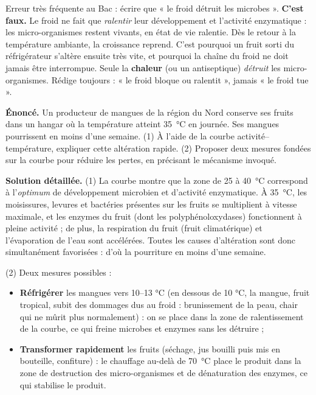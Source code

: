 \documentclass[11pt]{article}
\begin{document}
\begin{attention}
Erreur très fréquente au Bac : écrire que « le froid détruit les microbes ». \textbf{C'est faux.} Le froid ne fait que \emph{ralentir} leur développement et l'activité enzymatique : les micro-organismes restent vivants, en état de vie ralentie. Dès le retour à la température ambiante, la croissance reprend. C'est pourquoi un fruit sorti du réfrigérateur s'altère ensuite très vite, et pourquoi la chaîne du froid ne doit jamais être interrompue. Seule la \textbf{chaleur} (ou un antiseptique) \emph{détruit} les micro-organismes. Rédige toujours : « le froid bloque ou ralentit », jamais « le froid tue ».
\end{attention}

\begin{exoresolu}
\textbf{Énoncé.} Un producteur de mangues de la région du Nord conserve ses fruits dans un hangar où la température atteint \SI{35}{\celsius} en journée. Ses mangues pourrissent en moins d'une semaine. (1) À l'aide de la courbe activité--température, expliquer cette altération rapide. (2) Proposer deux mesures fondées sur la courbe pour réduire les pertes, en précisant le mécanisme invoqué.

\tcblower
\textbf{Solution détaillée.}
(1) La courbe montre que la zone de 25 à \SI{40}{\celsius} correspond à l'\emph{optimum} de développement microbien et d'activité enzymatique. À \SI{35}{\celsius}, les moisissures, levures et bactéries présentes sur les fruits se multiplient à vitesse maximale, et les enzymes du fruit (dont les polyphénoloxydases) fonctionnent à pleine activité ; de plus, la respiration du fruit (fruit climatérique) et l'évaporation de l'eau sont accélérées. Toutes les causes d'altération sont donc simultanément favorisées : d'où la pourriture en moins d'une semaine.

(2) Deux mesures possibles :
\begin{itemize}
\item \textbf{Réfrigérer} les mangues vers 10--13 \si{\celsius} (en dessous de 10 \si{\celsius}, la mangue, fruit tropical, subit des dommages dus au froid : brunissement de la peau, chair qui ne mûrit plus normalement) : on se place dans la zone de ralentissement de la courbe, ce qui freine microbes et enzymes sans les détruire ;
\item \textbf{Transformer rapidement} les fruits (séchage, jus bouilli puis mis en bouteille, confiture) : le chauffage au-delà de \SI{70}{\celsius} place le produit dans la zone de destruction des micro-organismes et de dénaturation des enzymes, ce qui stabilise le produit.
\end{itemize}
\end{exoresolu}
\end{document}
